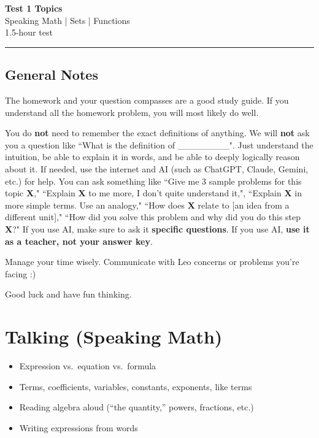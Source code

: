 \documentclass[12pt]{article}
\begin{document}
\pagestyle{fancy}
\begin{center}
  {\Large\bfseries Test 1 Topics}\\[4pt]
  Speaking Math \;|\; Sets \;|\; Functions \\[6pt]
  1.5-hour test
\end{center}
\hrule\bigskip

\subsection*{General Notes}

The homework and your question compasses are a good study guide. If you understand all the homework problem, you will most likely do well. 

You do \textbf{not} need to remember the exact definitions of anything. We will \textbf{not} ask you a question like ``What is the definition of \_\_\_\_\_\_\_\_". Just understand the intuition, be able to explain it in words, and be able to deeply logically reason about it. If needed, use the internet and AI (such as ChatGPT, Claude, Gemini, etc.) for help. You can ask something like ``Give me 3 sample problems for this topic \textbf{X}," ``Explain \textbf{X} to me more, I don't quite understand it,", ``Explain \textbf{X} in more simple terms. Use an analogy," ``How does \textbf{X} relate to [an idea from a different unit]," ``How did you solve this problem and why did you do this step \textbf{X}?" If you use AI, make sure to ask it \textbf{specific questions}. If you use AI,\textbf{ use it as a teacher, not your answer key}.

Manage your time wisely. Communicate with Leo concerns or problems you're facing :)

Good luck and have fun thinking.

\section*{Talking (Speaking Math)}
\begin{itemize}
  \item Expression vs.\ equation vs.\ formula
  \item Terms, coefficients, variables, constants, exponents, like terms
  \item Reading algebra aloud (``the quantity,'' powers, fractions, etc.)
  \item Writing expressions from words
\end{itemize}
\end{document}
